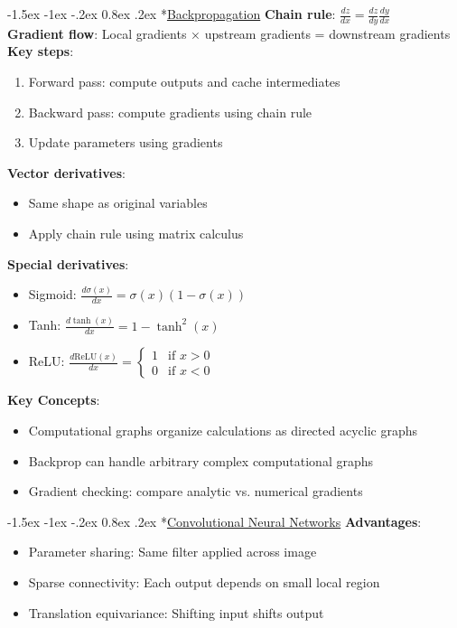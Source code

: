 \documentclass{article}
\makeatletter
\renewcommand\section{\@startsection{section}{1}{\z@}%
                                  {-1.5ex \@plus -1ex \@minus -.2ex}%
                                  {0.8ex \@plus.2ex}%
                                  {\normalfont\small\bfseries}}
\makeatother
\begin{document}
\begin{multicols}{3}
\section*{\underline{Backpropagation}}
\textbf{Chain rule}: $\frac{dz}{dx} = \frac{dz}{dy} \frac{dy}{dx}$\\
\textbf{Gradient flow}: Local gradients × upstream gradients = downstream gradients\\
\textbf{Key steps}:
\begin{enumerate}
\item Forward pass: compute outputs and cache intermediates
\item Backward pass: compute gradients using chain rule
\item Update parameters using gradients
\end{enumerate}

\textbf{Vector derivatives}:
\begin{itemize}
\item Same shape as original variables
\item Apply chain rule using matrix calculus
\end{itemize}

\textbf{Special derivatives}:
\begin{itemize}
\item Sigmoid: $\frac{d\sigma(x)}{dx} = \sigma(x)(1-\sigma(x))$
\item Tanh: $\frac{d\tanh(x)}{dx} = 1 - \tanh^2(x)$
\item ReLU: $\frac{d\text{ReLU}(x)}{dx} = \begin{cases} 1 & \text{if } x > 0 \\ 0 & \text{if } x < 0 \end{cases}$
\end{itemize}

\textbf{Key Concepts}:
\begin{itemize}
\item Computational graphs organize calculations as directed acyclic graphs
\item Backprop can handle arbitrary complex computational graphs
\item Gradient checking: compare analytic vs. numerical gradients
\end{itemize}

\section*{\underline{Convolutional Neural Networks}}
\textbf{Advantages}:
\begin{itemize}
\item Parameter sharing: Same filter applied across image
\item Sparse connectivity: Each output depends on small local region
\item Translation equivariance: Shifting input shifts output
\end{itemize}


\end{multicols}
\end{document}

